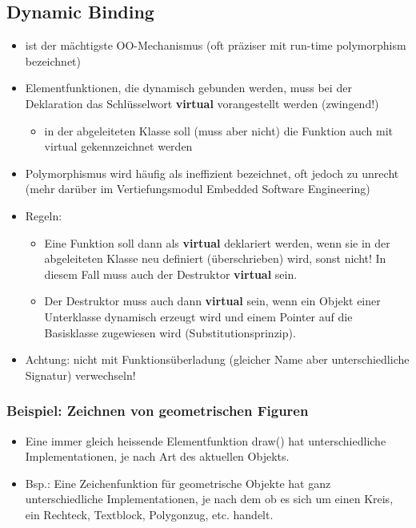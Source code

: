 \subsection{Dynamic Binding}
\label{sec:Dynamic Binding}
\begin{itemize}
	\item ist der mächtigste OO-Mechanismus (oft präziser mit run-time polymorphism bezeichnet)
	\item Elementfunktionen, die dynamisch gebunden werden, muss bei der Deklaration das Schlüsselwort \textbf{virtual} vorangestellt werden (zwingend!)
	\begin{itemize}
		\item in der abgeleiteten Klasse soll (muss aber nicht) die Funktion auch mit virtual gekennzeichnet werden
	\end{itemize}
	\item Polymorphismus wird häufig als ineffizient bezeichnet, oft jedoch zu unrecht (mehr darüber im Vertiefungsmodul Embedded Software Engineering)
	\item Regeln:
	\begin{itemize}
		\item Eine Funktion soll dann als \textbf{virtual} deklariert werden, wenn sie in der abgeleiteten Klasse neu definiert (überschrieben) wird, sonst nicht! In diesem Fall muss auch der Destruktor \textbf{virtual} sein.
		\item Der Destruktor muss auch dann \textbf{virtual} sein, wenn ein Objekt einer Unterklasse dynamisch erzeugt wird und einem Pointer auf die Basisklasse zugewiesen wird (Substitutionsprinzip).
	\end{itemize}
	\item Achtung: nicht mit Funktionsüberladung (gleicher Name aber unterschiedliche Signatur) verwechseln!
\end{itemize}

\subsubsection{Beispiel: Zeichnen von geometrischen Figuren}
\begin{itemize}
	\item Eine immer gleich heissende Elementfunktion draw() hat unterschiedliche Implementationen, je nach Art des aktuellen Objekts.
	\item Bsp.: Eine Zeichenfunktion für geometrische Objekte hat ganz unterschiedliche Implementationen, je nach dem ob es sich um einen Kreis, ein Rechteck, Textblock, Polygonzug, etc. handelt.
\end{itemize}

